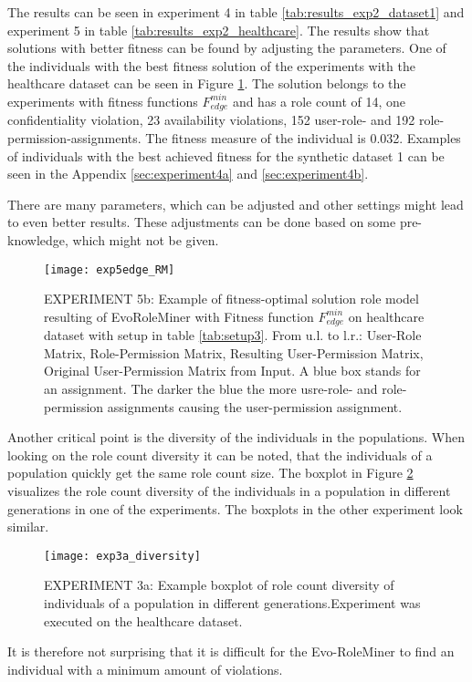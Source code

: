 The results can be seen in experiment 4 in table \ref{tab:results_exp2_dataset1} and experiment 5 in table \ref{tab:results_exp2_healthcare}. The results show that solutions with better fitness can be found by adjusting the parameters. One of the individuals with the best fitness solution of the experiments with the healthcare dataset can be seen in Figure \ref{fig:exp5edge_RM}. The solution belongs to the experiments with fitness functions $F_{edge}^{min}$ and has a role count of 14, one confidentiality violation, 23 availability violations, 152 user-role- and 192 role-permission-assignments. The fitness measure of the individual is 0.032. Examples of individuals with the best achieved fitness for the synthetic dataset 1 can be seen in the Appendix \ref{sec:experiment4a} and \ref{sec:experiment4b}.

There are many parameters, which can be adjusted and other settings might lead to even better results. These adjustments can be done based on some pre-knowledge, which might not be given.

\begin{figure}[H]
    \centering
    \texttt{[image: exp5edge\_RM]}
    \caption{EXPERIMENT 5b: Example of fitness-optimal solution role model resulting of EvoRoleMiner with Fitness function $F_{edge}^{min}$ on healthcare dataset with setup in table \ref{tab:setup3}. From u.l. to l.r.: User-Role Matrix, Role-Permission Matrix, Resulting User-Permission Matrix, Original User-Permission Matrix from Input. A blue box stands for an assignment. The darker the blue the more usre-role- and role-permission assignments causing the user-permission assignment.}
    \label{fig:exp5edge_RM}
\end{figure}

Another critical point is the diversity of the individuals in the populations. When looking on the role count diversity it can be noted, that the individuals of a population quickly get the same role count size. The boxplot in Figure \ref{fig:exp3a_diversity} visualizes the role count diversity of the individuals in a population in different generations in one of the experiments. The boxplots in the other experiment look similar.

\begin{figure}[H]
	\centering
	\texttt{[image: exp3a\_diversity]}
	\caption{EXPERIMENT 3a: Example boxplot of role count diversity of individuals of a population in different generations.Experiment was executed on the healthcare dataset.}
	\label{fig:exp3a_diversity}
\end{figure}

It is therefore not surprising that it is difficult for the Evo-RoleMiner to find an individual with a minimum amount of violations.